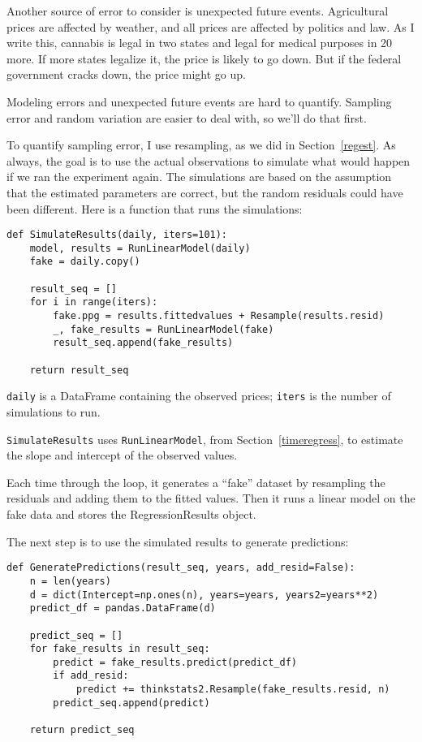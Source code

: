 \documentclass[12pt]{book}
\begin{document}
Another source of error to consider is unexpected future events.
Agricultural prices are affected by weather, and all prices are
affected by politics and law.  As I write this, cannabis is legal in
two states and legal for medical purposes in 20 more.  If more states
legalize it, the price is likely to go down.  But if
the federal government cracks down, the price might go up.

Modeling errors and unexpected future events are hard to quantify.
Sampling error and random variation are easier to deal with, so we'll
do that first.

To quantify sampling error, I use resampling, as we did in
Section~\ref{regest}.  As always, the goal is to use the actual
observations to simulate what would happen if we ran the experiment
again.  The simulations are based on the assumption that the estimated
parameters are correct, but the random residuals could have been
different.  Here is a function that runs the simulations:

\begin{verbatim}
def SimulateResults(daily, iters=101):
    model, results = RunLinearModel(daily)
    fake = daily.copy()
    
    result_seq = []
    for i in range(iters):
        fake.ppg = results.fittedvalues + Resample(results.resid)
        _, fake_results = RunLinearModel(fake)
        result_seq.append(fake_results)

    return result_seq
\end{verbatim}

{\tt daily} is a DataFrame containing the observed prices;
{\tt iters} is the number of simulations to run.

{\tt SimulateResults} uses {\tt RunLinearModel}, from
Section~\ref{timeregress}, to estimate the slope and intercept
of the observed values.

Each time through the loop, it generates a ``fake'' dataset by
resampling the residuals and adding them to the fitted values.  Then
it runs a linear model on the fake data and stores the RegressionResults
object.

The next step is to use the simulated results to generate predictions:

\begin{verbatim}
def GeneratePredictions(result_seq, years, add_resid=False):
    n = len(years)
    d = dict(Intercept=np.ones(n), years=years, years2=years**2)
    predict_df = pandas.DataFrame(d)
    
    predict_seq = []
    for fake_results in result_seq:
        predict = fake_results.predict(predict_df)
        if add_resid:
            predict += thinkstats2.Resample(fake_results.resid, n)
        predict_seq.append(predict)

    return predict_seq
\end{verbatim}
\end{document}
